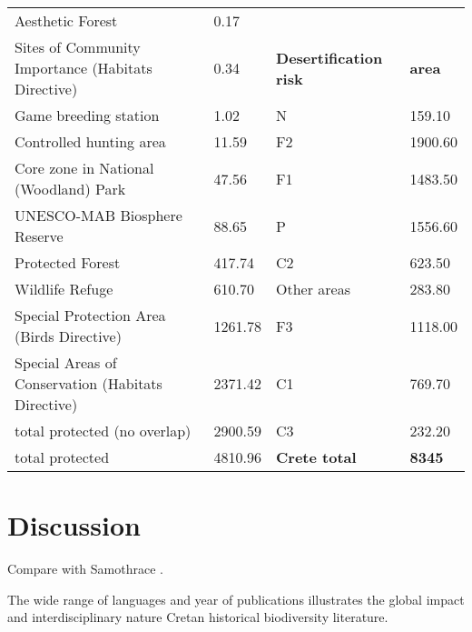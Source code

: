 \begin{longtable}{llll}
Aesthetic Forest                                   & 0.17          &                                            &                  \\
Sites of Community Importance (Habitats Directive) & 0.34          & \textbf{Desertification risk}              & \textbf{area}    \\
Game breeding station                              & 1.02          & N                                          & 159.10           \\
Controlled hunting area                            & 11.59         & F2                                         & 1900.60          \\
Core zone in National (Woodland) Park              & 47.56         & F1                                         & 1483.50          \\
UNESCO-MAB Biosphere Reserve                       & 88.65         & P                                          & 1556.60          \\
Protected Forest                                   & 417.74        & C2                                         & 623.50           \\
Wildlife Refuge                                    & 610.70        & Other areas                                & 283.80           \\
Special Protection Area (Birds Directive)          & 1261.78       & F3                                         & 1118.00          \\
Special Areas of Conservation (Habitats Directive) & 2371.42       & C1                                         & 769.70           \\
total protected (no overlap)                       & 2900.59       & C3                                         & 232.20           \\
total protected                                    & 4810.96       & \textbf{Crete total}                       & \textbf{8345}
\end{longtable}


\section{Discussion}\label{crete_idea_discussion}

Compare with Samothrace \parencite{noll2024insights}.

The wide range of languages and year of publications illustrates the global impact and interdisciplinary nature Cretan historical biodiversity literature.


